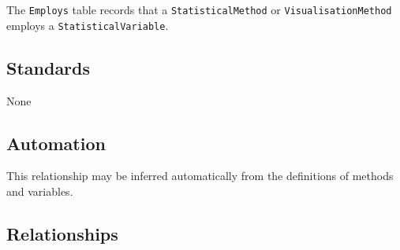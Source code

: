 \documentclass[
]{article}
\begin{document}
The \texttt{Employs} table records that a \texttt{StatisticalMethod} or
\texttt{VisualisationMethod} employs a \texttt{StatisticalVariable}.

\subsection{Standards}\label{standards-14}

None

\subsection{Automation}\label{automation-14}

This relationship may be inferred automatically from the definitions of
methods and variables.

\subsection{Relationships}\label{relationships-10}
\end{document}
